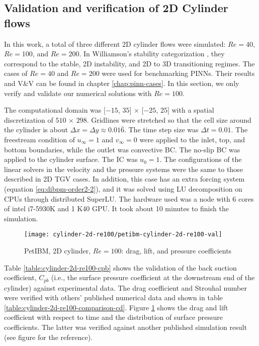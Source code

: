 \subsection*{Validation and verification of 2D Cylinder flows}

In this work, a total of three different 2D cylinder flows were simulated: $Re=40$, $Re=100$, and $Re=200$.
In Williamson's stability categorization \cite{williamson_vortex_1996}, they correspond to the stable, 2D instability, and 2D to 3D transitioning regimes.
The cases of $Re=40$ and $Re=200$ were used for benchmarking PINNs.
Their results and V\&V can be found in chapter \ref{chap:pinn-cases}.
In this section, we only verify and validate our numerical solutions with $Re=100$.

The computational domain was $[-15$, $35]$ $\times$ $[-25$, $25]$ with a spatial discretization of $510$ $\times$ $298$.
Gridlines were stretched so that the cell size around the cylinder is about $\Delta x = \Delta y \approx 0.01\bar{6}$.
The time step size was $\Delta t = 0.01$.
The freestream condition of $u_{\infty}=1$ and $v_{\infty}=0$ were applied to the inlet, top, and bottom boundaries, while the outlet was convective BC.
The no-slip BC was applied to the cylinder surface.
The IC was $u_0=1$.
The configurations of the linear solvers in the velocity and the pressure systems were the same to those described in 2D TGV cases.
In addition, this case has an extra forcing system (equation \eqref{eq:dibpm-order2-2}), and it was solved using LU decomposition on CPUs through distributed SuperLU.
The hardware used was a node with 6 cores of intel i7-5930K and 1 K40 GPU.
It took about 10 minutes to finish the simulation.



\begin{figure}[hbt!]
    \texttt{[image: cylinder-2d-re100/petibm-cylinder-2d-re100-val]}
    \caption{PetIBM, 2D cylinder, $Re=100$: drag, lift, and pressure coefficients}
    \label{fig:petibm-cylinder-2d-re100-val}
\end{figure}

Table \ref{table:cylinder-2d-re100-cpb} shows the validation of the back suction coefficient, $C_{pb}$ (i.e., the surface pressure coefficient at the downstream end of the cylinder) against experimental data.
The drag coefficient and Strouhal number were verified with others' published numerical data and shown in table \ref{table:cylinder-2d-re100-comparison-cd}.
Figure \ref{fig:petibm-cylinder-2d-re100-val} shows the drag and lift coefficient with respect to time and the distribution of surface pressure coefficients.
The latter was verified against another published simulation result (see figure for the reference).

